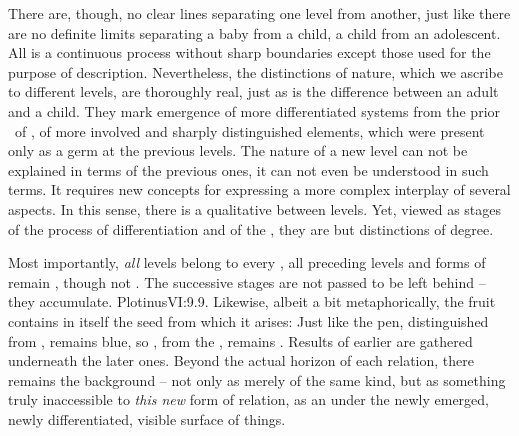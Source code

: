 There are, though, no clear lines separating one level from another, just like
there are no definite limits separating a baby from a child, a child from an
adolescent.  All is a continuous process without sharp boundaries except
those used for the purpose of description.  Nevertheless, the distinctions
of nature, which we ascribe to different levels, are thoroughly real, just as is
the difference between an adult and a child.  They mark emergence of more
differentiated systems from the prior \nexuss\ of , of more involved
and sharply distinguished elements, which were present only as a 
germ at the previous levels.  The nature of a new level can not be explained in
terms of the previous ones, it can not even be understood in such terms.  It
requires new concepts for expressing a more complex interplay of several
aspects.  In this sense, there is a qualitative  between levels.
Yet, viewed as stages of the process of differentiation and 
of the  , they are but distinctions of degree.

\label{pa:preserves}%
\pa Most importantly, {\em all} levels belong to every
, all preceding levels and forms of  remain
, though not .  The successive stages are not passed to be
left behind -- they accumulate. \citet{We have not been cut away; we are not
  separate; [...] we breath and hold our ground because the Supreme does not
  give and pass but gives on for ever, so long as it remains what it
  is.}{Plotinus}{VI:9.9. Likewise, albeit a bit metaphorically, the fruit
  contains in itself the seed from which it arises: } Just like the pen, distinguished from
, remains blue, so ,  from the ,
remains . Results of earlier 
are gathered underneath the later ones.  Beyond the actual horizon of each
relation, there remains the background -- not only as merely 
of the same kind, but as something truly inaccessible to {\em this new} form of
relation, as an  under the newly
emerged, newly differentiated, visible surface of things.

